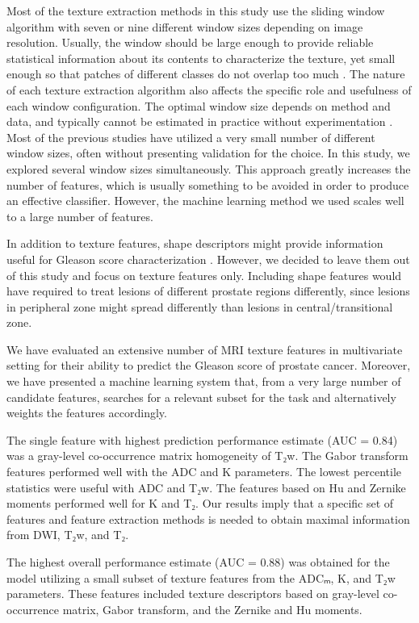 \documentclass[10pt,letterpaper]{article}
\newcommand{\citep}{\cite}
\begin{document}
Most of the texture extraction methods in this study use the sliding window
algorithm with seven or nine different window sizes depending on image
resolution. Usually, the window should be large enough to provide reliable
statistical information about its contents to characterize the texture, yet
small enough so that patches of different classes do not overlap too much
\citep{Haralick1973, Clausi2002Analysis}. The nature of each texture extraction
algorithm also affects the specific role and usefulness of each window
configuration. The optimal window size depends on method and data, and typically
cannot be estimated in practice without experimentation \citep{Puig2001}. Most
of the previous studies have utilized a very small number of different window
sizes, often without presenting validation for the choice. In this study, we
explored several window sizes simultaneously. This approach greatly increases
the number of features, which is usually something to be avoided in order to
produce an effective classifier. However, the machine learning method we used
scales well to a large number of features.

In addition to texture features, shape descriptors might provide information
useful for Gleason score characterization \citep{Hoeks2011}. However, we
decided to leave them out of this study and focus on texture features only.
Including shape features would have required to treat lesions of different
prostate regions differently, since lesions in peripheral zone might spread
differently than lesions in central/transitional zone.

We have evaluated an extensive number of MRI texture features in multivariate
setting for their ability to predict the Gleason score of prostate cancer.
Moreover, we have presented a machine learning system that, from a very large
number of candidate features, searches for a relevant subset for the task and
alternatively weights the features accordingly.

The single feature with highest
prediction performance estimate (AUC = 0.84) was a gray-level co-occurrence
matrix homogeneity of T₂w. The Gabor transform features performed well with the
ADC and K parameters. The lowest percentile statistics were useful with ADC and
T₂w. The features based on Hu and Zernike moments performed well for K and T₂.
Our results imply that a specific set of features and feature extraction methods
is needed to obtain maximal information from DWI, T₂w, and T₂.

The highest
overall performance estimate (AUC = 0.88) was obtained for the model utilizing a
small subset of texture features from the ADCₘ, K, and T₂w parameters. These
features included texture descriptors based on gray-level co-occurrence matrix,
Gabor transform, and the Zernike and Hu moments.
\end{document}
